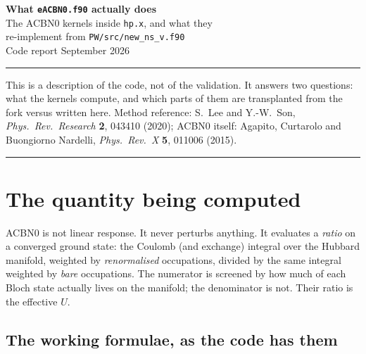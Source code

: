 \documentclass[11pt,a4paper]{article}
\begin{document}
\begin{center}
{\LARGE\bfseries What \texttt{eACBN0.f90} actually does}\\[4pt]
{\large\color{mute} The ACBN0 kernels inside \texttt{hp.x}, and what they\\
re-implement from \texttt{PW/src/new\_ns\_v.f90}}\\[9pt]
{\small Code report \quad\textbullet{} September 2026}
\end{center}

\vspace{2pt}
\noindent\textcolor{rule}{\rule{\textwidth}{0.8pt}}
\vspace{5pt}

\noindent
This is a description of the code, not of the validation. It answers two
questions: what the kernels compute, and which parts of them are transplanted
from the fork versus written here. Method reference: S.~Lee and Y.-W.~Son,
\emph{Phys.\ Rev.\ Research} \textbf{2}, 043410 (2020); ACBN0 itself: Agapito,
Curtarolo and Buongiorno Nardelli, \emph{Phys.\ Rev.\ X} \textbf{5}, 011006
(2015).

\vspace{2pt}
\noindent\textcolor{rule}{\rule{\textwidth}{0.8pt}}

\section{The quantity being computed}

ACBN0 is not linear response. It never perturbs anything. It evaluates a
\emph{ratio} on a converged ground state: the Coulomb (and exchange) integral
over the Hubbard manifold, weighted by \emph{renormalised} occupations, divided
by the same integral weighted by \emph{bare} occupations. The numerator is
screened by how much of each Bloch state actually lives on the manifold; the
denominator is not. Their ratio is the effective $U$.

\subsection{The working formulae, as the code has them}
\end{document}
